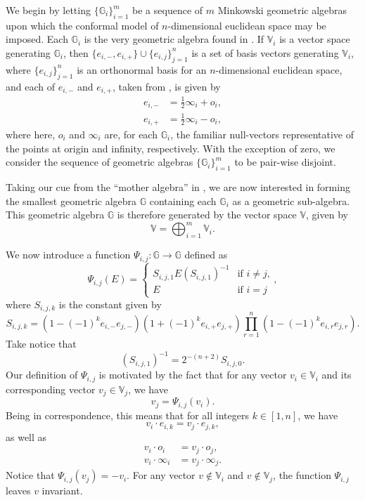 \documentclass{ecgd-l}
\theoremstyle{definition}
\theoremstyle{remark}
\numberwithin{equation}{section}
\newcommand{\G}{\mathbb{G}}
\newcommand{\V}{\mathbb{V}}
\newcommand{\nvai}{\infty}
\newcommand{\nvao}{o}
\begin{document}
We begin by letting $\{\G_i\}_{i=1}^m$ be a sequence of $m$ Minkowski geometric algebras upon
which the conformal model of $n$-dimensional euclidean space may be imposed.
Each $\G_i$ is the very geometric algebra found in \cite{}.  If $\V_i$ is a vector space
generating $\G_i$, then $\{e_{i,-},e_{i,+}\}\cup\{e_{i,j}\}_{j=1}^n$ is a set of basis
vectors generating $\V_i$, where $\{e_{i,j}\}_{j=1}^n$ is an orthonormal basis
for an $n$-dimensional euclidean space, and each of $e_{i,-}$ and $e_{i,+}$, taken from \cite{}, is given by
\begin{align*}
e_{i,-} &= \frac{1}{2}\nvai_i + \nvao_i, \\
e_{i,+} &= \frac{1}{2}\nvai_i - \nvao_i,
\end{align*}
where here, $\nvao_i$ and $\nvai_i$ are, for each $\G_i$, the familiar null-vectors
representative of the points at origin and infinity, respectively.
With the exception of zero, we consider the sequence of geometric algebras $\{\G_i\}_{i=1}^m$
to be pair-wise disjoint.

Taking our cue from the ``mother algebra'' in \cite{},
we are now interested in forming the smallest geometric algebra $\G$
containing each $\G_i$ as a geometric sub-algebra.  This geometric
algebra $\G$ is therefore generated by the vector space $\V$, given by
\begin{equation*}
\V=\bigoplus_{i=1}^m \V_i.
\end{equation*}

We now introduce a function $\Psi_{i,j}:\G\to\G$ defined as
\begin{equation*}
\Psi_{i,j}(E) = \left\{\begin{array}{ll}
S_{i,j,1}E(S_{i,j,1})^{-1} & \mbox{if $i\neq j$,} \\
E & \mbox{if $i=j$}\end{array}\right.,
\end{equation*}
where $S_{i,j,k}$ is the constant given by
\begin{equation}\label{equ_S}
S_{i,j,k} = \left(1-(-1)^ke_{i,-}e_{j,-}\right)\left(1+(-1)^ke_{i,+}e_{j,+}\right)\prod_{r=1}^n\left(1-(-1)^ke_{i,r}e_{j,r}\right).
\end{equation}
Take notice that
\begin{equation*}
(S_{i,j,1})^{-1} = 2^{-(n+2)}S_{i,j,0}.
\end{equation*}
Our definition of $\Psi_{i,j}$ is motivated by the fact that for any vector $v_i\in\V_i$ and its
corresponding vector $v_j\in\V_j$, we have
\begin{equation*}
v_j = \Psi_{i,j}(v_i).
\end{equation*}
Being in correspondence, this means that for all integers $k\in[1,n]$,
we have
\begin{equation*}
v_i\cdot e_{i,k}=v_j\cdot e_{j,k},
\end{equation*}
as well as
\begin{align*}
v_i\cdot\nvao_i &= v_j\cdot\nvao_j, \\
v_i\cdot\nvai_i &= v_j\cdot\nvai_j.
\end{align*}
Notice that $\Psi_{i,j}(v_j)=-v_i$.
For any vector $v\not\in\V_i$ and $v\not\in\V_j$, the function $\Psi_{i,j}$ leaves $v$ invariant.
\end{document}
